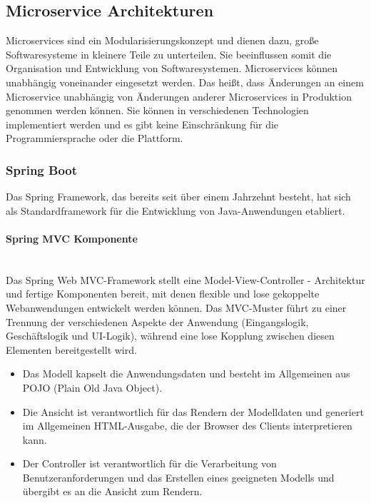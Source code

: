 \subsection{Microservice Architekturen}

Microservices sind ein Modularisierungskonzept und dienen dazu, große Softwaresysteme in kleinere Teile zu unterteilen. Sie beeinflussen somit die Organisation und Entwicklung von Softwaresystemen. Microservices können unabhängig voneinander eingesetzt werden. Das heißt, dass Änderungen an einem Microservice unabhängig von Änderungen anderer Microservices in Produktion genommen werden können. Sie können in verschiedenen Technologien implementiert werden und es gibt keine Einschränkung für die Programmiersprache oder die Plattform\cite[45--46]{wolff2016microservices}.

\subsubsection{Spring Boot}

Das Spring Framework, das bereits seit über einem Jahrzehnt besteht, hat sich als Standardframework für die Entwicklung von Java-Anwendungen etabliert.

\paragraph{Spring MVC Komponente}\mbox{}\\

Das Spring Web MVC-Framework stellt eine Model-View-Controller - Architektur und fertige Komponenten bereit, mit denen flexible und lose gekoppelte Webanwendungen entwickelt werden können. Das MVC-Muster führt zu einer Trennung der verschiedenen Aspekte der Anwendung (Eingangslogik, Geschäftslogik und UI-Logik), während eine lose Kopplung zwischen diesen Elementen bereitgestellt wird\cite{tp12mvc}.

\begin{itemize}
	\item Das Modell kapselt die Anwendungsdaten und besteht im Allgemeinen aus POJO (Plain Old Java Object).
	\item Die Ansicht ist verantwortlich für das Rendern der Modelldaten und generiert im Allgemeinen HTML-Ausgabe, die der Browser des Clients interpretieren kann.
	\item Der Controller ist verantwortlich für die Verarbeitung von Benutzeranforderungen und das Erstellen eines geeigneten Modells und übergibt es an die Ansicht zum Rendern.
\end{itemize}

